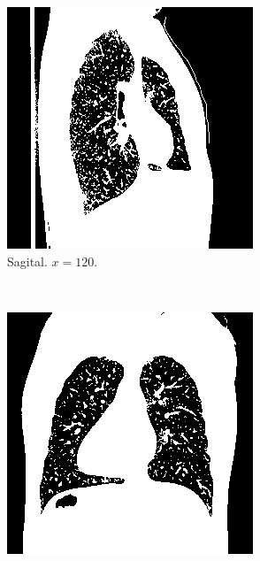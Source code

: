 \documentclass{article}
\begin{document}
\begin{figure}[h]
    \centering
    \begin{subfigure}[b]{0.3\textwidth}
        \includegraphics[width=\textwidth]{thorax/_neuroradiologist-sagital-gray.png}
        \caption{Sagital. $x=120$.}
    \end{subfigure}
    ~
    \begin{subfigure}[b]{0.3\textwidth}
        \includegraphics[width=\textwidth]{thorax/neuroradiologist-coronal-gray.png}

\end{subfigure}
\end{figure}
\end{document}

